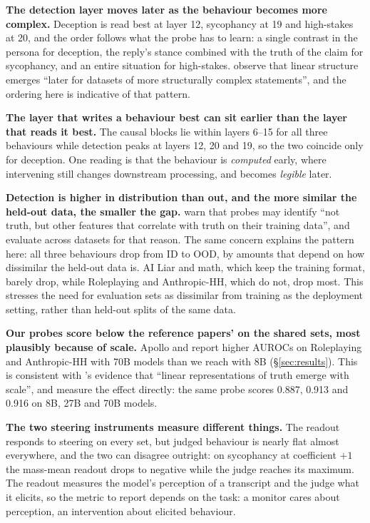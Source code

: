 \textbf{The detection layer moves later as the behaviour becomes more
complex.} Deception is read best at layer 12, sycophancy at 19 and
high-stakes at 20, and the order follows what the probe has to learn: a
single contrast in the persona for deception, the reply's stance combined
with the truth of the claim for sycophancy, and an entire situation for
high-stakes. \citeauthor{marks2024} observe that linear structure emerges
``later for datasets of more structurally complex statements'', and the
ordering here is indicative of that pattern.

\textbf{The layer that writes a behaviour best can sit earlier than the
layer that reads it best.} The causal blocks lie within layers 6--15 for
all three behaviours while detection peaks at layers 12, 20 and 19, so
the two coincide only for deception. One reading is that the behaviour is
\emph{computed} early, where intervening still changes downstream
processing, and becomes \emph{legible} later.

\textbf{Detection is higher in distribution than out, and the more similar
the held-out data, the smaller the gap.} \citeauthor{marks2024} warn that
probes may identify ``not truth, but other features that correlate with
truth on their training data'', and evaluate across datasets for that
reason. The same concern explains the pattern here: all three behaviours
drop from ID to OOD, by amounts that depend on how dissimilar the held-out
data is. AI Liar and math, which keep the training format, barely drop,
while Roleplaying and Anthropic-HH, which do not, drop most. This stresses
the need for evaluation sets as dissimilar from training as the
deployment setting, rather than held-out splits of the same data.

\textbf{Our probes score below the reference papers' on the shared sets,
most plausibly because of scale.} Apollo and \citeauthor{mckenzie2025}
report higher AUROCs on Roleplaying and Anthropic-HH with 70B models than
we reach with 8B (\S\ref{sec:results}). This is consistent with
\citeauthor{marks2024}'s evidence that ``linear representations of truth
emerge with scale'', and \citeauthor{mckenzie2025} measure the effect
directly: the same probe scores 0.887, 0.913 and 0.916 on 8B, 27B and 70B
models. 

\textbf{The two steering instruments measure different things.} The
readout responds to steering on every set, but judged behaviour is nearly
flat almost everywhere, and the two can disagree outright: on sycophancy
at coefficient $+1$ the mass-mean readout drops to negative while the judge
reaches its maximum. The readout measures the model's perception of a
transcript and the judge what it elicits, so the metric to report depends
on the task: a monitor cares about perception, an intervention about
elicited behaviour.

